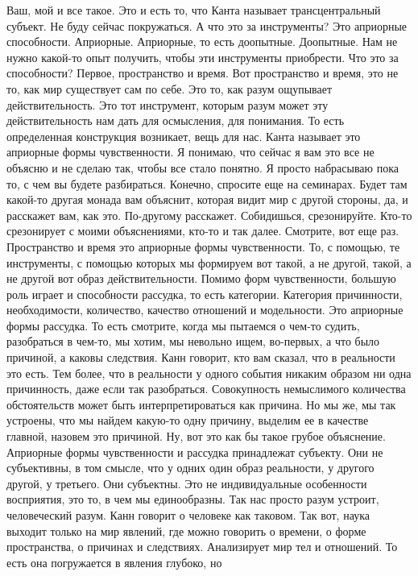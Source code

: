 Ваш, мой и все такое. Это и есть то, что Канта называет трансцентральный
субъект. Не буду сейчас покружаться. А что это за инструменты? Это априорные
способности. Априорные. Априорные, то есть доопытные. Доопытные. Нам не нужно
какой-то опыт получить, чтобы эти инструменты приобрести. Что это за
способности? Первое, пространство и время. Вот пространство и время, это не то,
как мир существует сам по себе. Это то, как разум ощупывает действительность.
Это тот инструмент, которым разум может эту действительность нам дать для
осмысления, для понимания. То есть определенная конструкция возникает, вещь для
нас. Канта называет это априорные формы чувственности. Я понимаю, что сейчас я
вам это все не объясню и не сделаю так, чтобы все стало понятно. Я просто
набрасываю пока то, с чем вы будете разбираться. Конечно, спросите еще на
семинарах. Будет там какой-то другая монада вам объяснит, которая видит мир с
другой стороны, да, и расскажет вам, как это. По-другому расскажет. Собидишься,
срезонируйте. Кто-то срезонирует с моими объяснениями, кто-то и так далее.
Смотрите, вот еще раз. Пространство и время это априорные формы чувственности.
То, с помощью, те инструменты, с помощью которых мы формируем вот такой, а не
другой, такой, а не другой вот образ действительности. Помимо форм
чувственности, большую роль играет и способности рассудка, то есть категории.
Категория причинности, необходимости, количество, качество отношений и
модельности. Это априорные формы рассудка. То есть смотрите, когда мы пытаемся о
чем-то судить, разобраться в чем-то, мы хотим, мы невольно ищем, во-первых, а
что было причиной, а каковы следствия. Канн говорит, кто вам сказал, что в
реальности это есть. Тем более, что в реальности у одного события никаким
образом ни одна причинность, даже если так разобраться. Совокупность немыслимого
количества обстоятельств может быть интерпретироваться как причина. Но мы же, мы
так устроены, что мы найдем какую-то одну причину, выделим ее в качестве
главной, назовем это причиной. Ну, вот это как бы такое грубое объяснение.
Априорные формы чувственности и рассудка принадлежат субъекту. Они не
субъективны, в том смысле, что у одних один образ реальности, у другого другой,
у третьего. Они субъектны. Это не индивидуальные особенности восприятия, это то,
в чем мы единообразны. Так нас просто разум устроит, человеческий разум. Канн
говорит о человеке как таковом. Так вот, наука выходит только на мир явлений,
где можно говорить о времени, о форме пространства, о причинах и следствиях.
Анализирует мир тел и отношений. То есть она погружается в явления глубоко, но
